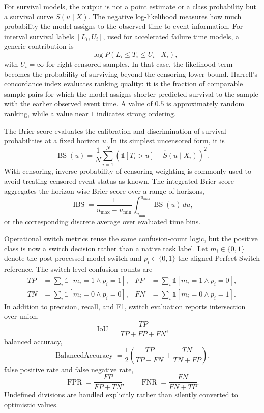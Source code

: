 For survival models, the output is not a point estimate or a class probability
but a survival curve \(S(u\mid X)\). The negative log-likelihood measures how
much probability the model assigns to the observed time-to-event information.
For interval survival labels \([L_i,U_i]\), used for accelerated failure time
models, a generic contribution is
\[
  -\log P(L_i \le T_i \le U_i \mid X_i),
\]
with \(U_i=\infty\) for right-censored samples. In that case, the likelihood
term becomes the probability of surviving beyond the censoring lower bound.
Harrell's concordance index evaluates ranking quality: it is the fraction of
comparable sample pairs for which the model assigns shorter predicted survival
to the sample with the earlier observed event time. A value of \(0.5\) is
approximately random ranking, while a value near \(1\) indicates strong
ordering.

The Brier score evaluates the calibration and discrimination of survival
probabilities at a fixed horizon \(u\). In its simplest uncensored form, it is
\[
  \operatorname{BS}(u)
  =
  \frac{1}{N}
  \sum_{i=1}^{N}
  \left(
    \mathbb{1}[T_i>u] - \widehat{S}(u\mid X_i)
  \right)^2 .
\]
With censoring, inverse-probability-of-censoring weighting is commonly used to
avoid treating censored event status as known. The integrated Brier score
aggregates the horizon-wise Brier score over a range of horizons,
\[
  \operatorname{IBS}
  =
  \frac{1}{u_{\max}-u_{\min}}
  \int_{u_{\min}}^{u_{\max}} \operatorname{BS}(u)\,du,
\]
or the corresponding discrete average over evaluated time bins.

Operational switch metrics reuse the same confusion-count logic, but the
positive class is now a switch decision rather than a native task label. Let
\(m_i\in\{0,1\}\) denote the post-processed model switch and
\(p_i\in\{0,1\}\) the aligned Perfect Switch reference. The switch-level
confusion counts are
\[
\begin{aligned}
  TP &= \sum_i \mathbb{1}[m_i=1 \land p_i=1], &
  FP &= \sum_i \mathbb{1}[m_i=1 \land p_i=0], \\
  TN &= \sum_i \mathbb{1}[m_i=0 \land p_i=0], &
  FN &= \sum_i \mathbb{1}[m_i=0 \land p_i=1].
\end{aligned}
\]
In addition to precision, recall, and F1, switch evaluation reports
intersection over union,
\[
  \operatorname{IoU}=\frac{TP}{TP+FP+FN},
\]
balanced accuracy,
\[
  \operatorname{BalancedAccuracy}
  =
  \frac{1}{2}
  \left(
    \frac{TP}{TP+FN}
    +
    \frac{TN}{TN+FP}
  \right),
\]
false positive rate and false negative rate,
\[
  \operatorname{FPR}=\frac{FP}{FP+TN},
  \qquad
  \operatorname{FNR}=\frac{FN}{FN+TP}.
\]
Undefined divisions are handled explicitly rather than silently converted to
optimistic values.

